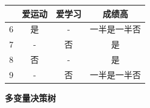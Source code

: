 \documentclass[answers]{exam}  %
\begin{document}
\begin{questions}
\begin{solution}
\begin{enumerate}
\begin{center}
                      \begin{tabular}{c|ccc}
                          \hline   & 爱运动 & 爱学习 & 成绩高       \\
                          \hline 6 & 是     & -      & 一半是一半否 \\
                          7        & -      & 否     & 是           \\
                          8        & 否     & -      & 是           \\
                          9        & -      & 否     & 一半是一半否 \\
                          \hline
                      \end{tabular}
                  \end{center}
        \end{enumerate}
    \end{solution}


    \question [20] \textbf{多变量决策树}


\end{questions}
\end{document}
